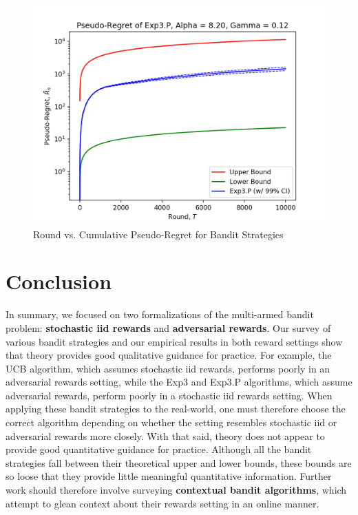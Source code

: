 \documentclass[12pt]{article}
\begin{document}
\begin{figure}[H]
\begin{center}
\begin{minipage}[h]{0.5\linewidth}
\includegraphics[width=\linewidth, height=0.75\linewidth]{exp3P-1.png}
\end{minipage}\end{center}
\captionsetup{justification=centering}
\caption{Round vs. Cumulative Pseudo-Regret for Bandit Strategies}
\label{fig:adversarial-rewards-2}
\end{figure}

\section{Conclusion}

In summary, we focused on two formalizations of the multi-armed bandit problem: \textbf{stochastic iid rewards} and \textbf{adversarial rewards}. Our survey of various bandit strategies and our empirical results in both reward settings show that theory provides good qualitative guidance for practice. For example, the UCB algorithm, which assumes stochastic iid rewards, performs poorly in an adversarial rewards setting, while the Exp3 and Exp3.P algorithms, which assume adversarial rewards, perform poorly in a stochastic iid rewards setting. When applying these bandit strategies to the real-world, one must therefore choose the correct algorithm depending on whether the setting resembles stochastic iid or adversarial rewards more closely. With that said, theory does not appear to provide good quantitative guidance for practice. Although all the bandit strategies fall between their theoretical upper and lower bounds, these bounds are so loose that they provide little meaningful quantitative information. Further work should therefore involve surveying \textbf{contextual bandit algorithms}, which attempt to glean context about their rewards setting in an online manner.

\newpage
\printbibliography
\end{document}
